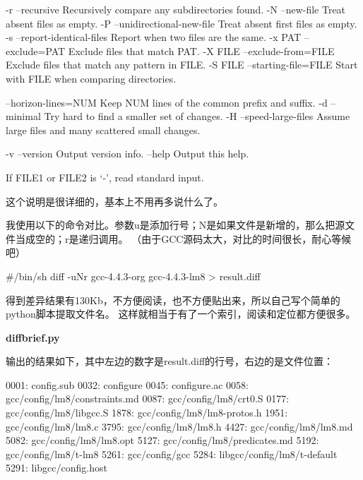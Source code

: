 \begin{textcode}
  -r  --recursive  Recursively compare any subdirectories found.
  -N  --new-file  Treat absent files as empty.
  -P  --unidirectional-new-file  Treat absent first files as empty.
  -s  --report-identical-files  Report when two files are the same.
  -x PAT  --exclude=PAT  Exclude files that match PAT.
  -X FILE  --exclude-from=FILE  Exclude files that match any pattern in FILE.
  -S FILE  --starting-file=FILE  Start with FILE when comparing directories.

  --horizon-lines=NUM  Keep NUM lines of the common prefix and suffix.
  -d  --minimal  Try hard to find a smaller set of changes.
  -H  --speed-large-files  Assume large files and many scattered small changes.

  -v  --version  Output version info.
  --help  Output this help.

If FILE1 or FILE2 is `-', read standard input.
\end{textcode}

这个说明是很详细的，基本上不用再多说什么了。

我使用以下的命令对比。参数u是添加行号；N是如果文件是新增的，那么把源文件当成空的；r是递归调用。
（由于GCC源码太大，对比的时间很长，耐心等候吧）
\begin{shcode}
#/bin/sh
diff -uNr gcc-4.4.3-org gcc-4.4.3-lm8 > result.diff
\end{shcode}

得到差异结果有130Kb，不方便阅读，也不方便贴出来，所以自己写个简单的python脚本提取文件名。
这样就相当于有了一个索引，阅读和定位都方便很多。

\textbf{diffbrief.py}


输出的结果如下，其中左边的数字是result.diff的行号，右边的是文件位置：
\begin{textcode}
0001: config.sub
0032: configure
0045: configure.ac
0058: gcc/config/lm8/constraints.md
0087: gcc/config/lm8/crt0.S
0177: gcc/config/lm8/libgcc.S
1878: gcc/config/lm8/lm8-protos.h
1951: gcc/config/lm8/lm8.c
3795: gcc/config/lm8/lm8.h
4427: gcc/config/lm8/lm8.md
5082: gcc/config/lm8/lm8.opt
5127: gcc/config/lm8/predicates.md
5192: gcc/config/lm8/t-lm8
5261: gcc/config/gcc
5284: libgcc/config/lm8/t-default
5291: libgcc/config.host
\end{textcode}

\clearpage
